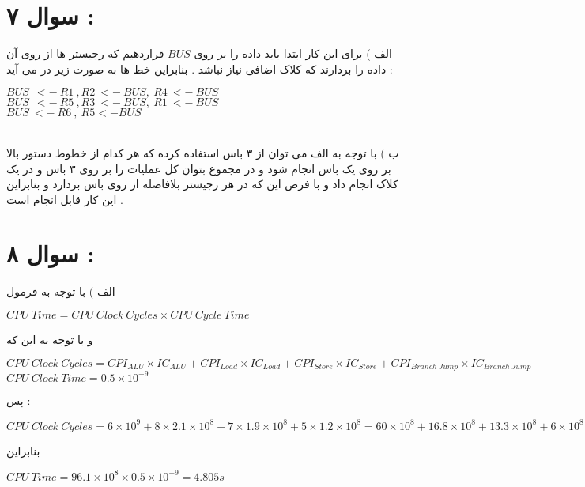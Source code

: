 \documentclass{article}
\begin{document}
\section*{سوال ۷ : }
الف  ) برای این کار ابتدا باید داده را بر روی 
$BUS$
قراردهیم که رجیستر ها از روی آن داده را بردارند که کلاک اضافی نیاز نباشد . بنابراین خط ها به صورت زیر در می آید  : 

\begin{center}
	$ BUS \   \ <- \  R1  \  ,R2  \ <- \ BUS ,  \ R4  \ <- \ BUS $\\
	$ BUS \   \ <- \  R5  \  ,R3  \ <- \ BUS ,  \ R1  \ <- \ BUS $\\
	$ BUS \ <- \ R6 \  , \ R5 <- BUS $
\end{center}
 \\
 ب ) با توجه به الف می توان از ۳ باس استفاده کرده که هر کدام از خطوط دستور بالا بر روی یک باس انجام شود و در مجموع بتوان کل عملیات را بر روی ۳ باس و در یک کلاک انجام داد و با فرض این که در هر رجیستر بلافاصله از روی باس بردارد و بنابراین این کار قابل انجام است  . 
\section*{سوال ۸  : }
الف ‌) با توجه به فرمول 
\begin{center}
	$ CPU \ Time = CPU \ Clock \ Cycles \times CPU \ Cycle \ Time $
\end{center}
و با توجه به این که 
\begin{center}
	$ CPU  \ Clock \ Cycles = CPI_{ALU} \times IC_{ALU} + CPI_{Load} \times IC_{Load} + CPI_{Store} \times IC_{Store} + CPI_{Branch \ Jump } \times IC_{Branch \ Jump }$ \\
	$ CPU \ Clock \ Time  = 0.5 \times 10^{-9}$
\end{center}
پس  : 
\begin{center}
	$ CPU \ Clock  \ Cycles = 6 \times 10^{9} + 8 \times 2.1 \times 10^8 + 7 \times 1.9 \times 10 ^8 + 5 \times 1.2 \times 10^8 = 60 \times 10 ^8 + 16.8 \times 10^8 + 13.3 \times 10^8 + 6 \times 10^8 = 96.1 \times 10^8$
\end{center}
بنابراین 
\begin{center}
	$CPU \ Time  = 96.1 \times 10 ^8 \times 0.5 \times 10^{-9} = 4.805s$
 \end{center}
\end{document}
